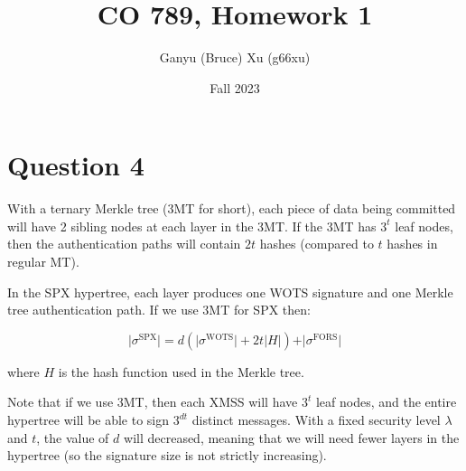 \documentclass{article}
\title{CO 789, Homework 1}
\author{Ganyu (Bruce) Xu (g66xu)}
\date{Fall 2023}
\begin{document}

\section*{Question 4}
With a ternary Merkle tree (3MT for short), each piece of data being committed will have 2 sibling nodes at each layer in the 3MT. If the 3MT has $3^t$ leaf nodes, then the authentication paths will contain $2t$ hashes (compared to $t$ hashes in regular MT).

In the SPX hypertree, each layer produces one WOTS signature and one Merkle tree authentication path. If we use 3MT for SPX then:

$$
\vert \sigma^\text{SPX} \vert = d(
    \vert \sigma^\text{WOTS} \vert + 2t \vert H \vert
) 
+ \vert \sigma^\text{FORS} \vert
$$

where $H$ is the hash function used in the Merkle tree.

Note that if we use 3MT, then each XMSS will have $3^t$ leaf nodes, and the entire hypertree will be able to sign $3^{dt}$ distinct messages. With a fixed security level $\lambda$ and $t$, the value of $d$ will decreased, meaning that we will need fewer layers in the hypertree (so the signature size is not strictly increasing).
\end{document}
